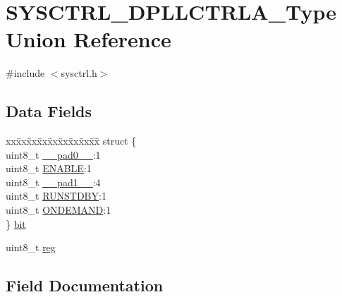 \hypertarget{union_s_y_s_c_t_r_l___d_p_l_l_c_t_r_l_a___type}{}\section{S\+Y\+S\+C\+T\+R\+L\+\_\+\+D\+P\+L\+L\+C\+T\+R\+L\+A\+\_\+\+Type Union Reference}
\label{union_s_y_s_c_t_r_l___d_p_l_l_c_t_r_l_a___type}


{\ttfamily \#include $<$sysctrl.\+h$>$}

\subsection*{Data Fields}
\begin{DoxyCompactItemize}
\item 
\begin{tabbing}
xx\=xx\=xx\=xx\=xx\=xx\=xx\=xx\=xx\=\kill
struct \{\\
\>uint8\_t \mbox{\hyperlink{union_s_y_s_c_t_r_l___d_p_l_l_c_t_r_l_a___type_a8b4eebe79ded0459acec2f4950102ba3}{\_\_pad0\_\_}}:1\\
\>uint8\_t \mbox{\hyperlink{union_s_y_s_c_t_r_l___d_p_l_l_c_t_r_l_a___type_a2b3662f1b123463ae1a23c1f324e5cc5}{ENABLE}}:1\\
\>uint8\_t \mbox{\hyperlink{union_s_y_s_c_t_r_l___d_p_l_l_c_t_r_l_a___type_a77f12d2e278bd5c07712648ac0df5e08}{\_\_pad1\_\_}}:4\\
\>uint8\_t \mbox{\hyperlink{union_s_y_s_c_t_r_l___d_p_l_l_c_t_r_l_a___type_aa24338c5cacc63e3b77adf2dc0938ff6}{RUNSTDBY}}:1\\
\>uint8\_t \mbox{\hyperlink{union_s_y_s_c_t_r_l___d_p_l_l_c_t_r_l_a___type_a5dd269b5401c67571b42907e4d18c253}{ONDEMAND}}:1\\
\} \mbox{\hyperlink{union_s_y_s_c_t_r_l___d_p_l_l_c_t_r_l_a___type_af4cb8687e64e6b927d0cf12d8b7fa0ed}{bit}}\\

\end{tabbing}\item 
uint8\+\_\+t \mbox{\hyperlink{union_s_y_s_c_t_r_l___d_p_l_l_c_t_r_l_a___type_a9428adc9af4653a2050e2536b55dec8d}{reg}}
\end{DoxyCompactItemize}


\subsection{Field Documentation}
\mbox{\label{union_s_y_s_c_t_r_l___d_p_l_l_c_t_r_l_a___type_a8b4eebe79ded0459acec2f4950102ba3}} 
